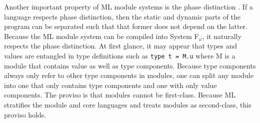 Another important property of ML module systems is the phase distinction \cite{hmm:phasedist}. If a language respects phase distinction, then the static and dynamic parts of the program can be separated such that that former does not depend on the latter. Because the ML module system can be compiled into System F$_\omega$, it naturally respects the phase distinction. At first glance, it may appear that types and values are entangled in type definitions such as \lstinline{type t = M.u} where M is a module that contains value as well as type components. Because type components always only refer to other type components in modules, one can split any module into one that only contains type components and one with only value components. The proviso is that modules cannot be first-class. Because ML stratifies the module and core languages and treats modules as second-class, this proviso holds. 
   

